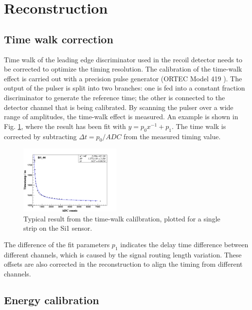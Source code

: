 \documentclass[number,5p]{elsarticle}
\begin{document}
\section{Reconstruction}
\label{sec:reconstruction}

\subsection{Time walk correction}
\label{sec:timewalk}

Time walk of the leading edge discriminator used in the recoil detector needs to be corrected to optimize the timing resolution.
The calibration of the time-walk effect is carried out with a precision pulse generator (ORTEC Model 419 \cite{ortec}). 
The output of the pulser is split into two branches: one is fed into a constant fraction discriminator to generate the reference time;
the other is connected to the detector channel that is being calibrated. 
By scanning the pulser over a wide range of amplitudes, the time-walk effect is measured.
An example is shown in Fig. \ref{fig:timewalk}, where the result has been fit with \(y=p_0 x^{-1} + p_1\). 
The time walk is corrected by subtracting \(\Delta t = p_0/ADC\) from the measured timing value.
\begin{figure}[htbp]
  \centering
  \includegraphics[width=0.45\textwidth]{./timewalk.png}
  \caption{Typical result from the time-walk calilbration, plotted for a single
    strip on the Si1 sensor.}
  \label{fig:timewalk}
\end{figure}

The difference of the fit parameters \(p_1\) indicates the delay time
difference between different channels, which is caused by the signal routing length variation.
These offsets are also corrected in the reconstruction to align the timing from different channels.

\subsection{Energy calibration}
\label{sec:calibration}
\end{document}

